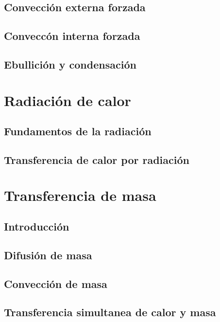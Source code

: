 \documentclass[11pt]{report}
\theoremstyle{plain}
\theoremstyle{definition}
\begin{document}
\section{Convección externa forzada}
%
\section{Conveccón interna forzada}
%
\section{Ebullición y condensación}


\chapter{Radiación de calor}
%
\section{Fundamentos de la radiación}
%
\section{Transferencia de calor por radiación}


\chapter{Transferencia de masa}
%
\section{Introducción}
%
\section{Difusión de masa}
%
\section{Convección de masa}
%
\section{Transferencia simultanea de calor y masa}


\end{document}
